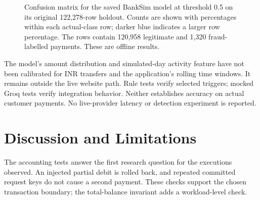 \documentclass[conference]{IEEEtran}
\begin{document}
\begin{figure}[tb]
\centering
\caption{Confusion matrix for the saved BankSim model at threshold 0.5 on its original 122,278-row holdout. Counts are shown with percentages within each actual-class row; darker blue indicates a larger row percentage. The rows contain 120,958 legitimate and 1,320 fraud-labelled payments. These are offline results.}
\label{fig:confusion}
\end{figure}

The model's amount distribution and simulated-day activity feature have not been calibrated for INR transfers and the application's rolling time windows. It remains outside the live website path. Rule tests verify selected triggers; mocked Groq tests verify integration behavior. Neither establishes accuracy on actual customer payments. No live-provider latency or detection experiment is reported.

\section{Discussion and Limitations}
The accounting tests answer the first research question for the executions observed. An injected partial debit is rolled back, and repeated committed request keys do not cause a second payment. These checks support the chosen transaction boundary; the total-balance invariant adds a workload-level check.
\end{document}
